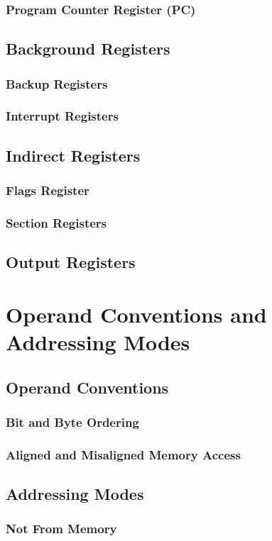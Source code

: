 \documentclass[oneside, a4paper]{memoir}
\begin{document}
\subsection{Program Counter Register (PC)}
\section{Background Registers}
\subsection{Backup Registers}
\subsection{Interrupt Registers}
\section{Indirect Registers}
\subsection{Flags Register}
\subsection{Section Registers}
\section{Output Registers}

\chapter{Operand Conventions and Addressing Modes}
\section{Operand Conventions}
\subsection{Bit and Byte Ordering}
\subsection{Aligned and Misaligned Memory Access}
\section{Addressing Modes}
\subsection{Not From Memory}
\end{document}

